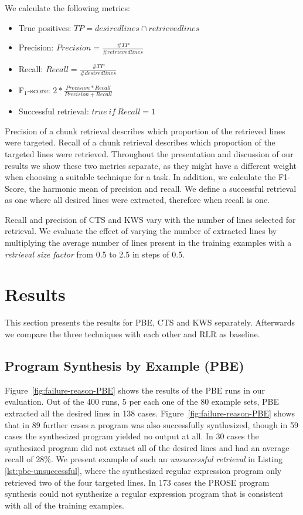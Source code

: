 \documentclass[\myrootdir/main.tex]{subfiles}
\begin{document}
We calculate the following metrics:
\begin{itemize}
	 \itemsep0.5em
	\item True positives: $TP = desiredlines \cap retrievedlines$
	\item Precision: $Precision =  \frac{\# TP}{\# retrievedlines}$
	\item Recall: $Recall = \frac{\# TP}{\# desiredlines}$
	\item F$_{1}$-score: $2 * \frac{Precision * Recall}{Precision + Recall}$
	\item Successful retrieval: $true\ if\ Recall = 1$
\end{itemize}

Precision of a chunk retrieval describes which proportion of the retrieved lines were targeted.
Recall of a chunk retrieval describes which proportion of the targeted lines were retrieved.
Throughout the presentation and discussion of our results we show these two metrics separate, as they might have a different weight when choosing a suitable technique for a task.
In addition, we calculate the F1-Score, the harmonic mean of precision and recall.
We define a successful retrieval as one where all desired lines were extracted, therefore when recall is one.

Recall and precision of CTS and KWS vary with the number of lines selected for retrieval.
We evaluate the effect of varying the number of extracted lines by multiplying the average number of lines present in the training examples with a \emph{retrieval size factor} from 0.5 to 2.5 in steps of 0.5.

\section{Results}
This section presents the results for PBE, CTS and KWS separately.
Afterwards we compare the three techniques with each other and RLR as baseline.

\subsection{Program Synthesis by Example (PBE)}
Figure~\ref{fig:failure-reason-PBE} shows the results of the PBE runs in our evaluation.
Out of the 400 runs, 5 per each one of the 80 example sets, PBE extracted all the desired lines in 138 cases.
Figure~\ref{fig:failure-reason-PBE} shows that in 89 further cases a program was also successfully synthesized, though in 59 cases the synthesized program yielded no output at all.
In 30 cases the synthesized program did not extract all of the desired lines and had an average recall of 28\%.
We present example of such an \emph{unsuccessful retrieval} in Listing \ref{lst:pbe-unsuccessful}, where the synthesized regular expression program only retrieved two of the four targeted lines.
In 173 cases the PROSE program synthesis could not synthesize a regular expression program that is consistent with all of the training examples.
\end{document}
